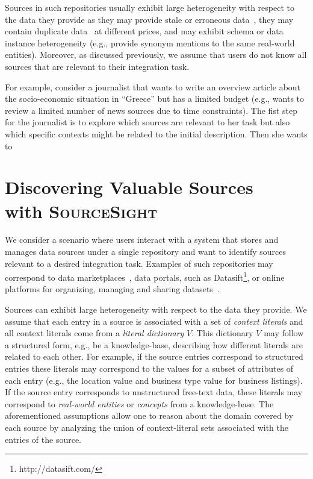 \documentclass{vldb}
\newcommand\system{\textsc{SourceSight}}
\begin{document}
Sources in such repositories usually exhibit large heterogeneity with respect to the data they provide as they may provide stale or erroneous data~\cite{Dong_vldb:2009, li:2012}, they may contain duplicate data~\cite{bronzi:2013, li:2012} at different prices, and may exhibit schema or data instance heterogeneity (e.g., provide synonym mentions to the same real-world entities). Moreover, as discussed previously, we assume that users do not know all sources that are relevant to their integration task.

For example, consider a journalist that wants to write an overview article about the socio-economic situation in ``Greece'' but has a limited budget (e.g., wants to review a limited number of news sources due to time constraints). The fist step for the journalist is to explore which sources are relevant to her task but also which specific contexts might be related to the initial description. Then she wants to 

\section{Discovering Valuable Sources \\ with {\Large \system}}
\label{sec:sources}
We consider a scenario where users interact with a system that stores and manages data sources under a single repository and want to identify sources relevant to a desired integration task. Examples of such repositories may correspond to data marketplaces~\cite{balazinska:vldb11}, data portals, such as Datasift\footnote{http://datasift.com/}, or online platforms for organizing, managing and sharing datasets~\cite{datahub}. 

Sources can exhibit large heterogeneity with respect to the data they provide. We assume that each entry in a source is associated with a set of {\em context literals} and all context literals come from a {\em literal dictionary} $V$. This dictionary $V$ may follow a structured form, e.g., be a knowledge-base, describing how different literals are related to each other. For example, if the source entries correspond to structured entries these literals may correspond to the values for a subset of attributes of each entry (e.g., the location value and business type value for business listings). If the source entry corresponds to unstructured free-text data, these literals may correspond to {\em real-world entities} or {\em concepts} from a knowledge-base. The aforementioned assumptions allow one to reason about the domain covered by each source by analyzing the union of context-literal sets associated with the entries of the source. 
\end{document}
